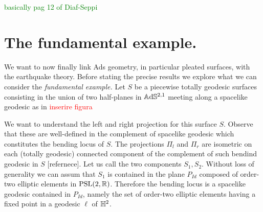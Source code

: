 \textcolor{green}{basically pag 12 of Diaf-Seppi}



    

\section{The fundamental example.} We want to now finally link Ads geometry, in particular pleated surfaces, with the earthquake theory. Before stating the precise results we explore what we can consider the \textit{fundamental example.} Let $S$ be a piecewise totally geodesic surfaces consisting in the union of two half-planes in $\mathbb{A}\mathrm{d}\mathbb{S}^{2,1}$ meeting along a spacelike geodesic as in \textcolor{red}{inserire figura}

We want to understand the left and right projection for this surface $S$. Observe that these are well-defined in the complement of spacelike geodesic which constitutes the bending locus of $S.$ The projections $\Pi_l$ and $\Pi_r$ are isometric on each (totally geodesic) connected component of the complement of such bendind geodesic in $S$ [refernece]. Let us call the two components $S_1,S_2$. Without loss of generality we can assum that $S_1$ is contained in the plane $P_{Id}$ composed of order-two elliptic elements in $\text{PSL}(2,\mathbb{R})$. Therefore the bending locus is a spacelike geodesic contained in $P_{Id}$, namely the set of order-two elliptic elements having a fixed point in a geodesic $\ell $ of $\mathbb{H}^2$.  
